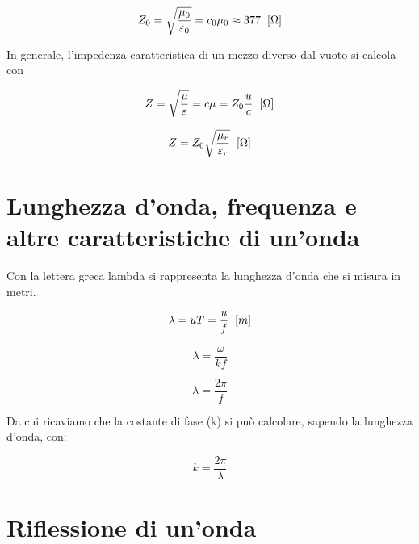 \documentclass{article}
\begin{document}
    \begin{equation}
        Z_0 = \sqrt{\frac{\mu_0}{\varepsilon_0}} = c_0 \mu_0 \approx 377 \hspace{0.2cm} [\Omega]
    \end{equation}

    In generale, l'impedenza caratteristica di un mezzo diverso dal vuoto si calcola con

    \begin{equation}
        Z = \sqrt{\frac{\mu}{\varepsilon}} = c \mu = Z_0 \frac{u}{c} \hspace{0.2cm} [\Omega]
    \end{equation}

    \begin{equation}
        Z = Z_0 \sqrt{\frac{\mu_r}{\varepsilon_r}} \hspace{0.2cm} [\Omega]
    \end{equation}

    \section{Lunghezza d'onda, frequenza e altre caratteristiche di un'onda}

    Con la lettera greca lambda si rappresenta la lunghezza d'onda che si misura in metri.

    \begin{equation}
        \lambda = u T = \frac{u}{f} \hspace{0.2cm} [m]
    \end{equation}

    \begin{equation}
        \lambda = \frac{\omega}{k f}
    \end{equation}

    \begin{equation}
        \lambda = \frac{2 \pi}{f}
    \end{equation}

    Da cui ricaviamo che la costante di fase (k) si può calcolare, sapendo la lunghezza d'onda, con:

    \begin{equation}
        k = \frac{2 \pi}{\lambda}
    \end{equation}

    \section{Riflessione di un'onda}
\end{document}
